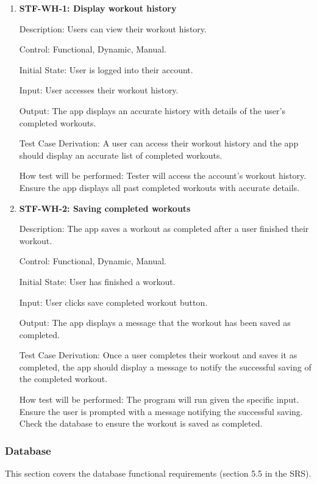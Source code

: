 \documentclass[12pt, titlepage]{article}
\begin{document}
    \begin{enumerate}

        \item{\textbf{STF-WH-1: Display workout history}\\}

        Description: Users can view their workout history.

        Control: Functional, Dynamic, Manual.

        Initial State: User is logged into their account.

        Input: User accesses their workout history.

        Output: The app displays an accurate history with details of the user’s completed workouts.

        Test Case Derivation: A user can access their workout history and the app should display an accurate list of completed workouts.

        How test will be performed: Tester will access the account’s workout history. Ensure the app displays all past completed workouts with accurate details.

        \item{\textbf{STF-WH-2: Saving completed workouts}\\}

        Description: The app saves a workout as completed after a user finished their workout.

        Control: Functional, Dynamic, Manual.

        Initial State: User has finished a workout.

        Input: User clicks save completed workout button.

        Output: The app displays a message that the workout has been saved as completed.

        Test Case Derivation: Once a user completes their workout and saves it as completed, the app should display a message to notify the successful saving of the completed workout.

        How test will be performed: The program will run given the specific input. Ensure the user is prompted with a message notifying the successful saving. Check the database to ensure the workout is saved as completed.

    \end{enumerate}

    \subsubsection{Database}
    This section covers the database functional requirements (section 5.5 in the SRS).
\end{document}
